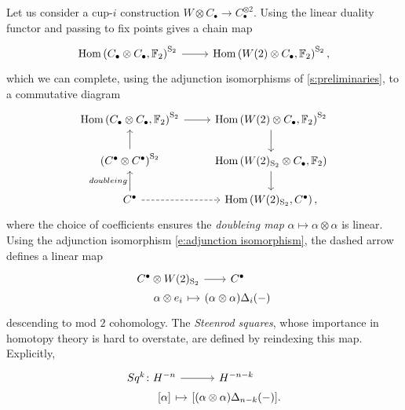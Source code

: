 Let us consider a cup-$i$ construction $W \otimes C_\bullet \to C_\bullet^{\otimes 2}$.
Using the linear duality functor and passing to fix points gives a chain map
\begin{equation*}
\begin{tikzcd}
\Hom\left(C_\bullet \otimes C_\bullet, \F_2 \right)^{\mathrm S_2} \arrow[r] &
\Hom\left(W(2) \otimes C_\bullet, \F_2 \right)^{\mathrm S_2},
\end{tikzcd}
\end{equation*}
which we can complete, using the adjunction isomorphisms of \cref{s:preliminaries}, to a commutative diagram
\begin{equation*}
\begin{tikzcd}
\Hom\left(C_\bullet \otimes C_\bullet, \F_2 \right)^{\mathrm S_2} \arrow[r] &
\Hom\left(W(2) \otimes C_\bullet, \F_2 \right)^{\mathrm S_2} \arrow[d] \\
\left(C^\bullet \otimes C^\bullet\right)^{\mathrm S_2} \arrow[u]&
\Hom\left(W(2)_{\mathrm S_2} \otimes C_\bullet, \F_2 \right) \arrow[d] \\
C^\bullet \arrow[u, "doubleing"] \arrow[r, dashed]&
\Hom\left(W(2)_{\mathrm S_2}, C^\bullet\right),
\end{tikzcd}
\end{equation*}
where the choice of coefficients ensures the \textit{doubleing map} $\alpha \mapsto \alpha \otimes \alpha$ is linear.
Using the adjunction isomorphism \eqref{e:adjunction isomorphism}, the dashed arrow defines a linear map
\begin{equation} \label{e:Steenrod squares parameterized}
\begin{tikzcd}[row sep=0pt, column sep = tiny]
C^\bullet \otimes W(2)_{\mathrm S_2} \arrow[r] &[-10pt] C^\bullet \\
\alpha \otimes e_i \arrow[r, |->] & (\alpha \otimes \alpha)\Delta_i(-)
\end{tikzcd}
\end{equation}
descending to mod $2$ cohomology.
The \textit{Steenrod squares}, whose importance in homotopy theory is hard to overstate, are defined by reindexing this map.
Explicitly,
\begin{equation*}
\begin{tikzcd}[row sep=0pt, column sep=tiny]
Sq^k \colon H^{-n} \arrow[r] & H^{-n-k} \\
\phantom{Sq^k \colon}{[\alpha]} \arrow[r, |->] & {\left[(\alpha \otimes \alpha)\Delta_{n-k}(-) \right]}.
\end{tikzcd}
\end{equation*}

